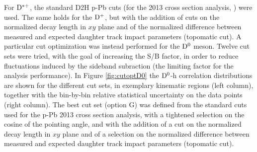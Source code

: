 For ${\rm D^{*+}}$, the standard D2H p-Pb cuts (for the 2013 cross section analysis, \cite{NoteD2HpPb}) were used. The same holds for the ${\rm D^+}$, but with the addition of cuts on the normalized decay length in $xy$ plane and of the normalized difference between measured and expected daughter track impact parameters (topomatic cut).
A particular cut optimization was instead performed for the ${\rm D^0}$ meson. Twelve cut sets were tried, with the goal of increasing the S/B factor, in order to reduce fluctuations induced by the sideband subraction (the limiting factor for the analysis performance).
In Figure \ref{fig:cutoptD0} the ${\rm D^0}$-h correlation distributions are shown for the different cut sets, in exemplary kinematic regions (left column), together with the bin-by-bin relative statistical uncertainty on the data points (right column). The best cut set (option G) was defined from the standard cuts used for the p-Pb 2013 cross section analysis, with a tightened selection on the cosine of the pointing angle, and with the addition of a cut on the normalized decay length in $xy$ plane and of a selection on the normalized difference between measured and expected daughter track impact parameters (topomatic cut).

